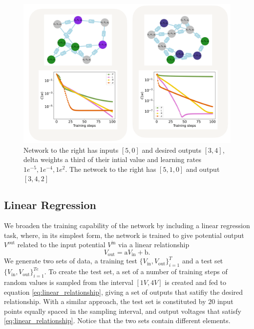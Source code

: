 \documentclass[reprint,superscriptaddress,prb,showkeys]{revtex4-2}
\begin{document}
\begin{figure}[h]
    \centering
    \includegraphics[width=\textwidth]{plots/general_network/mse_general.pdf}
    \caption{Network to the right has inputs $[5,0]$ and desired outputs $[3, 4]$, delta weights a third of their intial value and learning rates $1e^{-5}, 1e^{-4}, 1e^{2}$. The network to the right has $[5,1,0]$ and output $[3,4,2]$}\label{fig:mse_general}
\end{figure} 



\cleardoublepage
\subsection{Linear Regression}

We broaden the training capability of the network by including a linear regression task, where, in its simplest form, the network is trained to give potential output $V^{\text{out}}$ related to the input potential $V^{\text{in}}$ via a linear relationship
\begin{equation}
    V_{\text{out}} = \text{a} V_{\text{in}} + \text{b}.
\label{eq:linear_relationship}
\end{equation}
We generate two sets of data, a training test $ \{ V_{\text{in}}, V_{\text{out}} \}_{i=1}^{T}$ and a test set $\{ V_{\text{in}}, V_{\text{out}} \}_{i=1}^{Te}$. To create the test set, a set of a number of training steps of random values is sampled from the interval $[1V, 4V]$ is created and fed to equation \cref{eq:linear_relationship}, giving a set of outputs that satifiy the desired relationship. With a similar approach, the test set is constituted by $20$ input points equally spaced in the sampling interval, and output voltages that satisfy \cref{eq:linear_relationship}. Notice that the two sets contain different elements.
\end{document}
